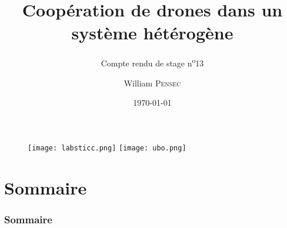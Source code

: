 \documentclass[12pt]{beamer}
\title[Compte rendu de stage n\textsuperscript{o}13]{Coopération de drones dans un système hétérogène}
\subtitle{Compte rendu de stage n\textsuperscript{o}13}
\author{William \textsc{Pensec}}
\institute[Lab-STICC]{Lab-Sticc}
\date{\today}
\begin{document}
	\begin{frame}
		\begin{titlepage}
			\begin{figure}[H]
				\centering
				\texttt{[image: labsticc.png]}
				\hspace{3cm}
				\texttt{[image: ubo.png]}
			\end{figure}
		\end{titlepage}
	\end{frame}
	
	\section*{Sommaire}
	\begin{frame}
		\frametitle{Sommaire}
		\begin{center}
			\tableofcontents
		\end{center}
	\end{frame}
\end{document}

